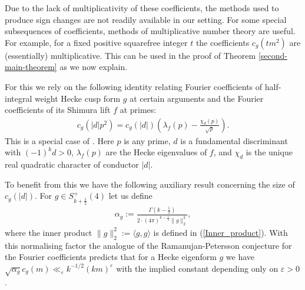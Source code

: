 \documentclass[a4paper,10pt,twoside]{amsart}
\theoremstyle{definition}
\numberwithin{equation}{section}
\renewcommand\:{\colon}
\begin{document}
Due to the lack of multiplicativity of these coefficients, the methods used to produce sign changes \cite{Ghosh-Sarnak2012, Matomaki2016, Lester-Matomaki-Radziwill2018} are not readily available in our setting. For some special subsequences of coefficients, methods of multiplicative number theory are useful. For example, for a fixed positive squarefree integer $t$ the coefficients $c_g(tm^2)$ are (essentially) multiplicative. This can be used in the proof of Theorem \ref{second-main-theorem} as we now explain. 

For this we rely on the following identity relating Fourier coefficients of half-integral weight Hecke cusp form $g$ at certain arguments and the Fourier coefficients of its Shimura lift $f$ at primes:
\begin{align}\label{Fourier-coeff-rel}
c_g(|d|p^2)=c_g(|d|)\left(\lambda_f(p)-\frac{\chi_d(p)}{\sqrt p}\right).
\end{align}
This is a special case of \cite[Equation (2)]{Kohnen-Zagier1981}. Here $p$ is any prime, $d$ is a fundamental discriminant with $(-1)^kd>0$, $\lambda_f(p)$ are the Hecke eigenvalues of $f$, and $\chi_d$ is the unique real quadratic character of conductor $|d|$. 

To benefit from this we have the following auxiliary result concerning the size of $c_g(|d|)$. For $g\in S_{k+\frac12}^+(4)$ let us define
\begin{align}\label{Normalisation}
\alpha_g:=\frac{\Gamma\left(k-\frac12\right)}{2\cdot(4\pi)^{k-\frac12}\|g\|_2^2},
\end{align}   
where the inner product $\|g\|_2^2:=\langle g,g\rangle$ is defined in (\ref{Inner_product}). With this normalising factor the analogue of the Ramanujan-Petersson conjecture for the Fourier coefficients predicts that for a Hecke eigenform $g$ we have $\sqrt{\alpha_g}c_g(m)\ll_\varepsilon k^{-1/2}(km)^\varepsilon$ with the implied constant depending only on $\varepsilon>0$.
\end{document}
